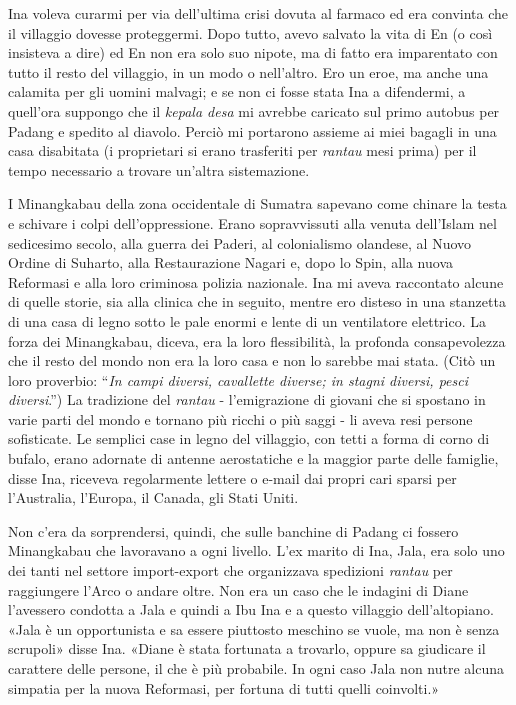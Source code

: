 Ina voleva curarmi per via dell'ultima crisi dovuta al farmaco ed era
convinta che il villaggio dovesse proteggermi. Dopo tutto, avevo salvato
la vita di En (o così insisteva a dire) ed En non era solo suo nipote,
ma di fatto era imparentato con tutto il resto del villaggio, in un modo
o nell'altro. Ero un eroe, ma anche una calamita per gli uomini malvagi;
e se non ci fosse stata Ina a difendermi, a quell'ora suppongo che il
\emph{kepala desa} mi avrebbe caricato sul primo autobus per Padang e
spedito al diavolo. Perciò mi portarono assieme ai miei bagagli in una
casa disabitata (i proprietari si erano trasferiti per \emph{rantau}
mesi prima) per il tempo necessario a trovare un'altra sistemazione.

I Minangkabau della zona occidentale di Sumatra sapevano come chinare la
testa e schivare i colpi dell'oppressione. Erano sopravvissuti alla
venuta dell'Islam nel sedicesimo secolo, alla guerra dei Paderi, al
colonialismo olandese, al Nuovo Ordine di Suharto, alla Restaurazione
Nagari e, dopo lo Spin, alla nuova Reformasi e alla loro criminosa
polizia nazionale. Ina mi aveva raccontato alcune di quelle storie, sia
alla clinica che in seguito, mentre ero disteso in una stanzetta di una
casa di legno sotto le pale enormi e lente di un ventilatore elettrico.
La forza dei Minangkabau, diceva, era la loro flessibilità, la profonda
consapevolezza che il resto del mondo non era la loro casa e non lo
sarebbe mai stata. (Citò un loro proverbio: ``\emph{In campi diversi,
	cavallette diverse; in stagni diversi, pesci diversi}.'') La tradizione
del \emph{rantau} - l'emigrazione di giovani che si spostano in varie
parti del mondo e tornano più ricchi o più saggi - li aveva resi persone
sofisticate. Le semplici case in legno del villaggio, con tetti a forma
di corno di bufalo, erano adornate di antenne aerostatiche e la maggior
parte delle famiglie, disse Ina, riceveva regolarmente lettere o e-mail
dai propri cari sparsi per l'Australia, l'Europa, il Canada, gli Stati
Uniti.

Non c'era da sorprendersi, quindi, che sulle banchine di Padang ci
fossero Minangkabau che lavoravano a ogni livello. L'ex marito di Ina,
Jala, era solo uno dei tanti nel settore import-export che organizzava
spedizioni \emph{rantau} per raggiungere l'Arco o andare oltre. Non era
un caso che le indagini di Diane l'avessero condotta a Jala e quindi a
Ibu Ina e a questo villaggio dell'altopiano. «Jala è un opportunista e
sa essere piuttosto meschino se vuole, ma non è senza scrupoli» disse
Ina. «Diane è stata fortunata a trovarlo, oppure sa giudicare il
carattere delle persone, il che è più probabile. In ogni caso Jala non
nutre alcuna simpatia per la nuova Reformasi, per fortuna di tutti
quelli coinvolti.»

